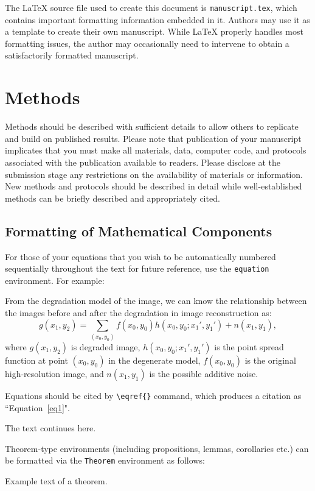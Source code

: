 \documentclass[12pt]{gsis}  %
\begin{document}
The LaTeX source file used to create this document is \texttt{manuscript.tex}, which contains important formatting information embedded in it. Authors may use it as a template to create their own manuscript. While LaTeX properly handles most formatting issues, the author may occasionally need to intervene to obtain a satisfactorily formatted manuscript.

\section{Methods}
Methods should be described with sufficient details to allow others to replicate and build on published results. Please note that publication of your manuscript implicates that you must make all materials, data, computer code, and protocols associated with the publication available to readers. Please disclose at the submission stage any restrictions on the availability of materials or information. New methods and protocols should be described in detail while well-established methods can be briefly described and appropriately cited.

\subsection{Formatting of Mathematical Components}
For those of your equations that you wish to be automatically numbered sequentially throughout the text for future reference, use the \texttt{equation} environment. For example:

From the degradation model of the image, we can know the relationship between the images before and after the degradation in image reconstruction as:
\begin{equation}
g(x_1,y_2)=\sum_{(x_0,y_0)}f(x_0,y_0)h(x_0,y_0;x_1',y_1')+n(x_1,y_1) ,
\label{eq1}
\end{equation}
where $g(x_1,y_2)$ is degraded image, $h(x_0,y_0;x_1',y_1')$ is the point spread function at point $(x_0,y_0)$   in the degenerate model,  $f(x_0,y_0)$ is the original high-resolution image, and  $n(x_1,y_1)$ is the possible additive noise. 

Equations should be cited by \verb"\eqref{}" command, which produces a citation as ``Equation~\eqref{eq1}".

The text continues here.

Theorem-type environments (including propositions, lemmas, corollaries etc.) can be formatted via the \texttt{Theorem} environment as follows:
\begin{Theorem}
Example text of a theorem.
\end{Theorem}
\end{document}
